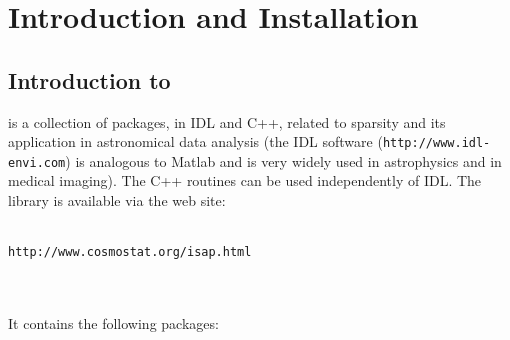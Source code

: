 
\chapter{{\isap}  Introduction and Installation}
\label{ch_install}

 
\section{Introduction to {\isap} }

{\isap} is a collection of packages, in IDL and C++, related to sparsity and its application in astronomical data analysis
(the IDL software (\texttt{http://www.idl-envi.com}) is analogous to Matlab and is very widely used in astrophysics and in medical imaging). 
 The C++ routines can be used independently of IDL.  The library is available via the web site:\\ \\
{ \centerline{\texttt{http://www.cosmostat.org/isap.html }}}\\
\\
It contains the following packages:
